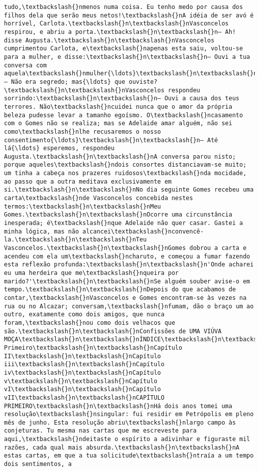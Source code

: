 \begin{Verbatim}[commandchars=\\\{\}]
tudo,\textbackslash{}nmenos numa coisa. Eu tenho medo por causa dos filhos dela que serão meus netos!\textbackslash{}nA idéia de ser avó é horrível, Carlota.\textbackslash{}n\textbackslash{}nVasconcelos respirou, e abriu a porta.\textbackslash{}n\textbackslash{}n— Ah! disse Augusta.\textbackslash{}n\textbackslash{}nVasconcelos cumprimentou Carlota, e\textbackslash{}napenas esta saiu, voltou-se para a mulher, e disse:\textbackslash{}n\textbackslash{}n— Ouvi a tua conversa com aquela\textbackslash{}nmulher{\ldots}\textbackslash{}n\textbackslash{}n— Não era segredo; mas{\ldots} que ouviste?\textbackslash{}n\textbackslash{}nVasconcelos respondeu sorrindo:\textbackslash{}n\textbackslash{}n— Ouvi a causa dos teus terrores. Não\textbackslash{}ncuidei nunca que o amor da própria beleza pudesse levar a tamanho egoísmo. O\textbackslash{}ncasamento com o Gomes não se realiza; mas se Adelaide amar alguém, não sei como\textbackslash{}nlhe recusaremos o nosso consentimento{\ldots}\textbackslash{}n\textbackslash{}n— Até lá{\ldots} esperemos, respondeu Augusta.\textbackslash{}n\textbackslash{}nA conversa parou nisto; porque aqueles\textbackslash{}ndois consortes distanciavam-se muito; um tinha a cabeça nos prazeres ruidosos\textbackslash{}nda mocidade, ao passo que a outra meditava exclusivamente em si.\textbackslash{}n\textbackslash{}nNo dia seguinte Gomes recebeu uma carta\textbackslash{}nde Vasconcelos concebida nestes termos:\textbackslash{}n\textbackslash{}nMeu Gomes.\textbackslash{}n\textbackslash{}nOcorre uma circunstância inesperada; é\textbackslash{}nque Adelaide não quer casar. Gastei a minha lógica, mas não alcancei\textbackslash{}nconvencê-la.\textbackslash{}n\textbackslash{}nTeu Vasconcelos.\textbackslash{}n\textbackslash{}nGomes dobrou a carta e acendeu com ela um\textbackslash{}ncharuto, e começou a fumar fazendo esta reflexão profunda:\textbackslash{}n\textbackslash{}n'Onde acharei eu uma herdeira que me\textbackslash{}nqueira por marido?'\textbackslash{}n\textbackslash{}nSe alguém souber avise-o em tempo.\textbackslash{}n\textbackslash{}nDepois do que acabamos de contar,\textbackslash{}nVasconcelos e Gomes encontram-se às vezes na rua ou no Alcazar; conversam,\textbackslash{}nfumam, dão o braço um ao outro, exatamente como dois amigos, que nunca foram,\textbackslash{}nou como dois velhacos que são.\textbackslash{}n\textbackslash{}nConfissões de UMA VIÚVA MOÇA\textbackslash{}n\textbackslash{}nÍNDICE\textbackslash{}n\textbackslash{}nCapítulo Primeiro\textbackslash{}n\textbackslash{}nCapítulo II\textbackslash{}n\textbackslash{}nCapítulo iii\textbackslash{}n\textbackslash{}nCapítulo iv\textbackslash{}n\textbackslash{}nCapítulo v\textbackslash{}n\textbackslash{}nCapítulo vI\textbackslash{}n\textbackslash{}nCapítulo vII\textbackslash{}n\textbackslash{}nCAPÍTULO PRIMEIRO\textbackslash{}n\textbackslash{}nHá dois anos tomei uma resolução\textbackslash{}nsingular: fui residir em Petrópolis em pleno mês de junho. Esta resolução abriu\textbackslash{}nlargo campo às conjeturas. Tu mesma nas cartas que me escreveste para aqui,\textbackslash{}ndeitaste o espírito a adivinhar e figuraste mil razões, cada qual mais absurda.\textbackslash{}n\textbackslash{}nA estas cartas, em que a tua solicitude\textbackslash{}ntraía a um tempo dois sentimentos, a 
\end{Verbatim}
